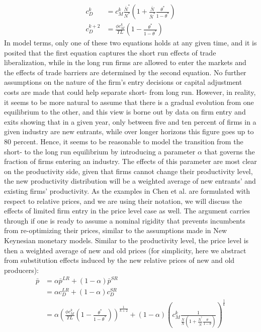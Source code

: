 \begin{align*}
c_D^k &= c_M^k \frac{\bar{N}^*}{N^*} \left( 1+ \frac{\bar{N}}{\bar{N}^*} \frac{\theta^*}{1-\theta^*} \right) \\
c_D^{k+2} &= \frac{\phi c_M^k}{\Upsilon L} \left(1- \frac{\theta^*}{1-\theta^*} \right)
\end{align*}
In model terms, only one of these two equations holds at any given time, and it is posited that the first equation captures the short run effects of trade liberalization, while in the long run firms are allowed to enter the markets and the effects of trade barriers are determined by the second equation. No further assumptions on the nature of the firm's entry decisions or capital adjustment costs are made that could help separate short- from long run. However, in reality, it seems to be more natural to assume that there is a gradual evolution from one equilibrium to the other, and this view is borne out by data on firm entry and exits showing that in a given year, only between five and ten percent of firms in a given industry are new entrants, while over longer horizons this figure goes up to 80 percent. Hence, it seems to be reasonable to model the transition from the short- to the long run equilibrium by introducing a parameter $\alpha$ that governs the fraction of firms entering an industry. The effects of this parameter are most clear on the productivity side, given that firms cannot change their productivity level, the new productivity distribution will be a weighted average of new entrants' and existing firms' productivity. As the examples in Chen et al. are formulated with respect to relative prices, and we are using their notation, we will discuss the effects of limited firm entry in the price level case as well. The argument carries through if one is ready to assume a nominal rigidity that prevents incumbents from re-optimizing their prices, similar to the assumptions made in New Keynesian monetary models. Similar to the productivity level, the price level is then a weighted average of new and old prices (for simplicity, here we abstract from substitution effects induced by the new relative prices of new and old producers):
\begin{align*}
\bar{p} &=\alpha \bar{p}^{LR} + (1-\alpha) \bar{p}^{SR} \\
				&=\alpha c_D^{LR} + (1-\alpha) c_D^{SR} \\
        &=\alpha \left( \frac{\phi c_M^k}{\Upsilon L} \left(1- \frac{\theta^*}{1-\theta^*}  \right) \right)^{\frac{1}{k+2}} + (1-\alpha) \left(c_M^k \frac{1}{ \frac{\bar{N}}{N}\left( 1+ \frac{\bar{N}^*}{\bar{N}} \frac{\theta}{1-\theta} \right) } \right)^{\frac{1}{k}}							
\end{align*}
